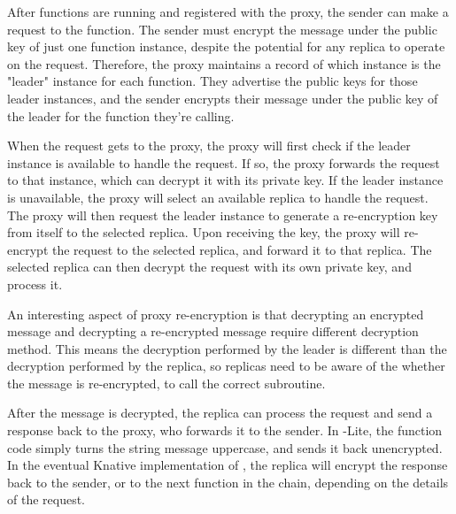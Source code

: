 After functions are running and registered with the proxy, the sender can make a request to the function.
The sender must encrypt the message under the public key of just one function instance, despite the potential for any replica to operate on the request.
Therefore, the proxy maintains a record of which instance is the "leader" instance for each function.
They advertise the public keys for those leader instances, and the sender encrypts their message under the public key of the leader for the function they're calling.

When the request gets to the proxy, the proxy will first check if the leader instance is available to handle the request.
If so, the proxy forwards the request to that instance, which can decrypt it with its private key.
If the leader instance is unavailable, the proxy will select an available replica to handle the request.
The proxy will then request the leader instance to generate a re-encryption key from itself to the selected replica.
Upon receiving the key, the proxy will re-encrypt the request to the selected replica, and forward it to that replica.
The selected replica can then decrypt the request with its own private key, and process it.

An interesting aspect of proxy re-encryption is that decrypting an encrypted message and decrypting a re-encrypted message require different decryption method.
This means the decryption performed by the leader is different than the decryption performed by the replica, so
replicas need to be aware of the whether the message is re-encrypted, to call the correct subroutine.

After the message is decrypted, the replica can process the request and send a response back to the proxy, who forwards it to the sender.
In \SystemName-Lite, the function code simply turns the string message uppercase, and sends it back unencrypted.
In the eventual Knative implementation of \SystemName, the replica will encrypt the response back to the sender, or to the next function in the chain, depending on the details of the request.

%
%
%



